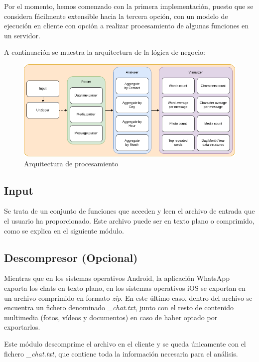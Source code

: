 Por el momento, hemos comenzado con la primera implementación, puesto que se considera fácilmente extensible hacia la tercera opción, con un modelo de ejecución en cliente con opción a realizar procesamiento de algunas funciones en un servidor.

A continuación se muestra la arquitectura de la lógica de negocio:

\begin{figure}[H]
	\centering
	\includegraphics[width=\textwidth]{img/architecture_processing.png}
	\caption{Arquitectura de procesamiento}
	\label{fig:chap4:architecture_processing}
\end{figure}


\subsection{Input}

Se trata de un conjunto de funciones que acceden y leen el archivo de entrada que el usuario ha proporcionado. Este archivo puede ser en texto plano o comprimido, como se explica en el siguiente módulo.

\subsection{Descompresor (Opcional)}

Mientras que en los sistemas operativos Android, la aplicación WhatsApp exporta los chats en texto plano, en los sistemas operativos iOS se exportan en un archivo comprimido en formato \textit{zip}. En este último caso, dentro del archivo se encuentra un fichero denominado \textit{\_chat.txt}, junto con el resto de contenido multimedia (fotos, vídeos y documentos) en caso de haber optado por exportarlos.

Este módulo descomprime el archivo en el cliente y se queda únicamente con el fichero \textit{\_chat.txt}, que contiene toda la información necesaria para el análisis.

